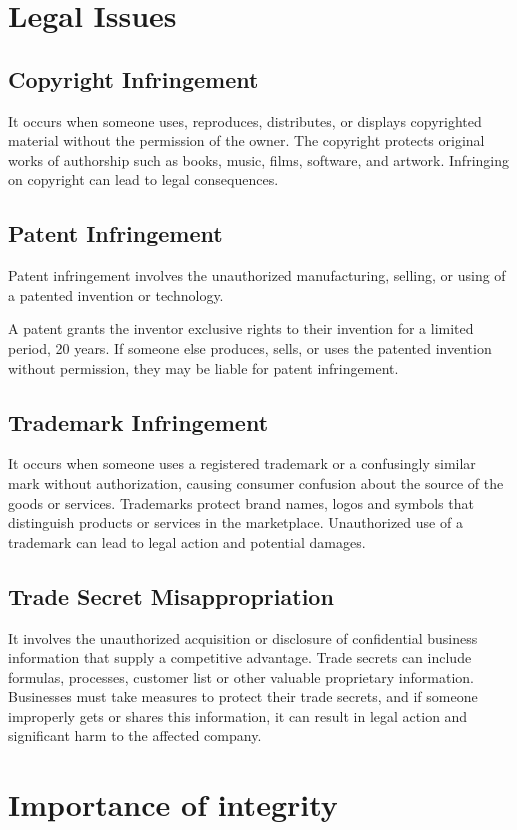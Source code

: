 \documentclass{report}
\begin{document}
\section*{Legal Issues}
\subsection*{Copyright Infringement}
It occurs when someone uses, reproduces, distributes, or displays copyrighted material without the permission of the owner. The copyright protects original works of authorship such as books, music, films, software, and artwork. Infringing on copyright can lead to legal consequences.
\subsection*{Patent Infringement}
Patent infringement involves the unauthorized manufacturing, selling, or using of a patented invention or technology.

A patent grants the inventor exclusive rights to their invention for a limited period, 20 years. If someone else produces, sells, or uses the patented invention without permission, they may be liable for patent infringement.
\subsection*{Trademark Infringement}
It occurs when someone uses a registered trademark or a confusingly similar mark without authorization, causing consumer confusion about the source of the goods or services. Trademarks protect brand names, logos and symbols that distinguish products or services in the marketplace. Unauthorized use of a trademark can lead to legal action and potential damages.
\subsection*{Trade Secret Misappropriation}
It involves the unauthorized acquisition or disclosure of confidential business information that supply a competitive advantage. Trade secrets can include formulas, processes, customer list or other valuable proprietary information. Businesses must take measures to protect their trade secrets, and if someone improperly gets or shares this information, it can result in legal action and significant harm to the affected company.
\section*{Importance of integrity}
\end{document}
